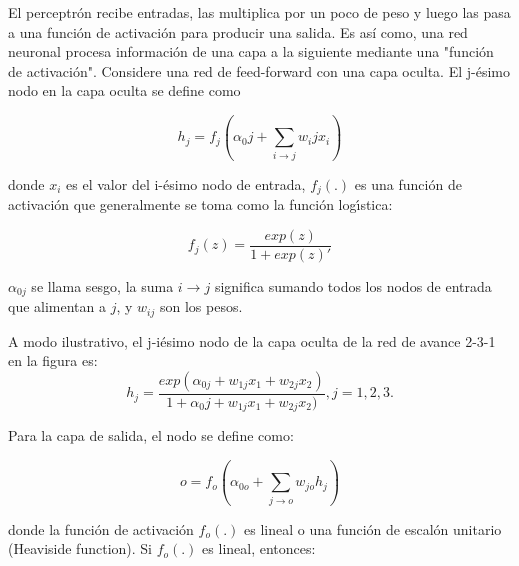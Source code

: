 	
	El perceptr\'on recibe entradas, las multiplica por un poco de peso y luego las pasa a una funci\'on de activaci\'on para producir una salida. Es as\'{i} como, una red neuronal procesa informaci\'on de una capa a la siguiente mediante una "funci\'on de activaci\'on". Considere una red de feed-forward con una capa oculta. El j-\'esimo nodo en la capa oculta se define como
	
	\begin{equation} 
	h_j = f_j \left(\alpha_0j + \sum_{i \to j} w_ij x_i \right)
	\end{equation}
	
	donde $x_i$ es el valor del i-\'esimo nodo de entrada, $f_j (.)$ es una funci\'on de activaci\'on que generalmente se toma como la funci\'on log\'{\i}stica:
	
	\begin{equation*} 
	f_j (z) = \frac{exp(z)}{1+exp(z)'}
	\end{equation*}
	
	$\alpha_{0 j}$ se llama sesgo, la suma $i \to j$ significa sumando todos los nodos de entrada que alimentan a $j$, y $w_{ij}$ son los pesos.
	
	
	A modo ilustrativo, el j-i\'esimo nodo de la capa oculta de la red de avance 2-3-1 en la figura es:
	\begin{equation}   \label{eq:-1}
	h_j = \frac{exp(\alpha_{0j}+w_{1j} x_1+w_{2j} x_2)}{1+\alpha_0j+w_{1j} x_1+w_{2j} x_2)}, j=1,2,3.
	\end{equation}
	
	Para la capa de salida, el nodo se define como:
	
	\begin{equation} 
	o = f_o \left(\alpha_{0o} + \sum_{j \to o} w_{jo} h_j \right)
	\end{equation}
	
	donde la funci\'on de activaci\'on $f_o (.)$ es lineal o una funci\'on de escal\'on unitario (Heaviside function). Si $f_o (.)$ es lineal, entonces:
	
